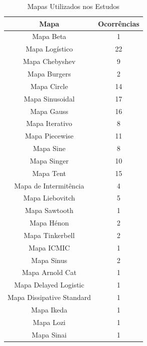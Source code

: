 
{\tiny
\begin{table}[!htpb]
    \centering
    \begin{tabular}{c|c} %
      \textbf{Mapa} & \textbf{Ocorrências} \\
      \hline
      Mapa Beta & 1\\
      \hline
    Mapa Logístico & 22\\
    \hline
    Mapa Chebyshev & 9 \\
    \hline
    Mapa Burgers & 2\\
    \hline
    Mapa Circle	 & 14\\
    \hline
    Mapa Sinusoidal	 & 17\\
    \hline
    Mapa Gauss & 16\\
    \hline
    Mapa Iterativo & 8\\
    \hline
    Mapa Piecewise & 11\\
    \hline
    Mapa Sine & 8\\
    \hline
    Mapa Singer	 & 10\\
    \hline
    Mapa Tent & 15\\
    \hline
    Mapa de Intermitência & 4\\
    \hline
    Mapa Liebovitch	& 5\\
    \hline
    Mapa Sawtooth & 1\\
    \hline
    Mapa Hénon & 2\\
    \hline
    Mapa Tinkerbell	 & 2\\
    \hline
    Mapa ICMIC & 1\\
    \hline
    Mapa Sinus & 2\\
    \hline
    Mapa Arnold Cat	& 1\\
    \hline
    Mapa Delayed Logistic & 1\\
    \hline
    Mapa Dissipative Standard & 1\\
    \hline
    Mapa Ikeda & 1\\
    \hline
    Mapa Lozi & 1\\
    \hline
    Mapa Sinai & 1\\
    \end{tabular}
    \caption{Mapas Utilizados nos Estudos}
    \label{tab:grafMapas}
\end{table}
}

